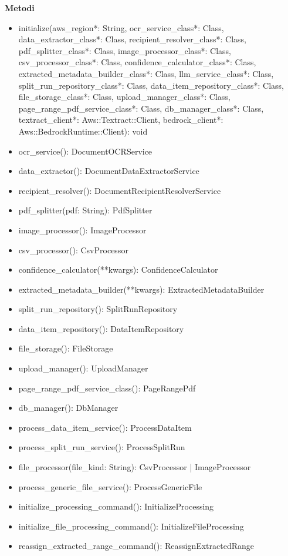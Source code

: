\documentclass[a4paper,11pt]{article}
\begin{document}
\textbf{Metodi} 
\begin{itemize}
    \item initialize(aws_region*: String, ocr_service_class*: Class, data_extractor_class*: Class, recipient_resolver_class*: Class, pdf_splitter_class*: Class, image_processor_class*: Class, csv_processor_class*: Class, confidence_calculator_class*: Class, extracted_metadata_builder_class*: Class, llm_service_class*: Class, split_run_repository_class*: Class, data_item_repository_class*: Class, file_storage_class*: Class, upload_manager_class*: Class, page_range_pdf_service_class*: Class, db_manager_class*: Class, textract_client*: Aws::Textract::Client, bedrock_client*: Aws::BedrockRuntime::Client): void
      \item ocr_service(): DocumentOCRService
      \item data_extractor(): DocumentDataExtractorService
      \item recipient_resolver(): DocumentRecipientResolverService
      \item pdf_splitter(pdf: String): PdfSplitter
      \item image_processor(): ImageProcessor
      \item csv_processor(): CsvProcessor
      \item confidence_calculator(**kwargs): ConfidenceCalculator
      \item extracted_metadata_builder(**kwargs): ExtractedMetadataBuilder
      \item split_run_repository(): SplitRunRepository
      \item data_item_repository(): DataItemRepository
      \item file_storage(): FileStorage
      \item upload_manager(): UploadManager
      \item page_range_pdf_service_class(): PageRangePdf
      \item db_manager(): DbManager
      \item process_data_item_service(): ProcessDataItem
      \item process_split_run_service(): ProcessSplitRun
      \item file_processor(file_kind: String): CsvProcessor | ImageProcessor
      \item process_generic_file_service(): ProcessGenericFile
      \item initialize_processing_command(): InitializeProcessing
      \item initialize_file_processing_command(): InitializeFileProcessing
      \item reassign_extracted_range_command(): ReassignExtractedRange
\end{itemize}
\end{document}
